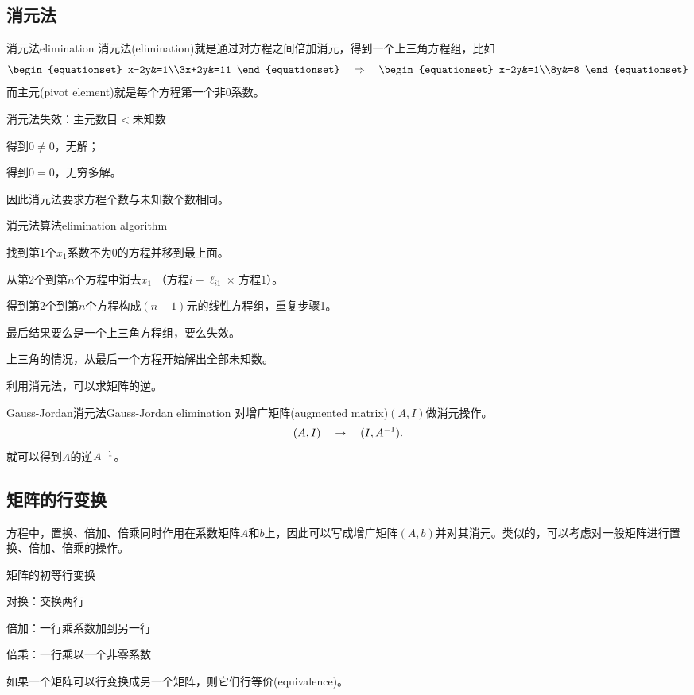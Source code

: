 \subsection{消元法}
\begin{definition}{消元法}{elimination}
	消元法(elimination)就是通过对方程之间倍加消元，得到一个上三角方程组，比如
	\[
		\begin{equationset}
			x-2y&=1\\3x+2y&=11
		\end{equationset}\thus
		\begin{equationset}
			x-2y&=1\\8y&=8
		\end{equationset}
	\]
	而主元(pivot element)就是每个方程第一个非0系数。
\end{definition}

消元法失效：主元数目$<$未知数
\begin{compactitem}
	\item 得到$0\neq 0$，无解；
	\item 得到$0=0$，无穷多解。
\end{compactitem}
因此消元法要求方程个数与未知数个数相同。

\begin{method}{消元法算法}{elimination algorithm}
	\begin{compactenum}
		\item 找到第1个$x_1$系数不为0的方程并移到最上面。%
		\item 从第2个到第$n$个方程中消去$x_1$ （方程$i-\ell_{i1}\times$\!\,方程1）。
		\item 得到第2个到第$n$个方程构成$(n-1)$元的线性方程组，重复步骤1。
		\item 最后结果要么是一个上三角方程组，要么失效。
		\item 上三角的情况，从最后一个方程开始解出全部未知数。
	\end{compactenum}
\end{method}

利用消元法，可以求矩阵的逆。
\begin{method}{Gauss-Jordan消元法}{Gauss-Jordan elimination}
	对增广矩阵(augmented matrix)\;$(A,I)$做消元操作。
	\[
		(A,I)\quad\to\quad(I,A^{-1}).
	\]
	就可以得到$A$的逆$A^{-1}$。
\end{method}
\subsection{矩阵的行变换}
方程中，置换、倍加、倍乘同时作用在系数矩阵$A$和$b$上，因此可以写成增广矩阵$(A,b)$并对其消元。类似的，可以考虑对一般矩阵进行置换、倍加、倍乘的操作。
\begin{definition}{矩阵的初等行变换}{}
	\begin{compactitem}
		\item 对换：交换两行
		\item 倍加：一行乘系数加到另一行
		\item 倍乘：一行乘以一个非零系数
	\end{compactitem}
\end{definition}
如果一个矩阵可以行变换成另一个矩阵，则它们行等价(equivalence)。

